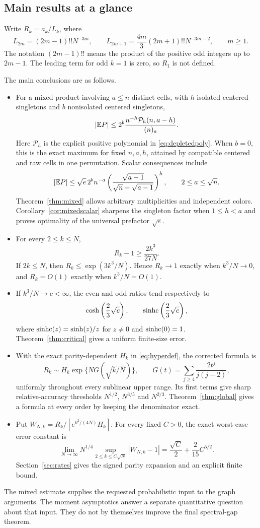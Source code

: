 \subsection{Main results at a glance}

Write $R_k=a_k/L_k$, where
\begin{equation}\label{eq:leading}
L_{2m}=(2m-1)!!N^{-3m},\qquad
L_{2m+1}=\frac{4m}{3}(2m+1)!!N^{-3m-2},\qquad m\ge1.
\end{equation}
The notation $(2m-1)!!$ means the product of the positive odd integers up to $2m-1$. The leading term for odd $k=1$ is zero, so $R_1$ is not defined.

The main conclusions are as follows.
\begin{itemize}
\item For a mixed product involving $a\le n$ distinct cells, with $h$ isolated centered singletons and $b$ nonisolated centered singletons,
\[
|\mathbb E P|\le2^b\frac{n^{-h}\mathcal P_h(n,a-h)}{(n)_a}.
\]
Here $\mathcal P_h$ is the explicit positive polynomial in \eqref{eq:depletedpoly}. When $b=0$, this is the exact maximum for fixed $n,a,h$, attained by compatible centered and raw cells in one permutation. Scalar consequences include
\[
|\mathbb E P|\le\sqrt e\,2^b n^{-a}
\left(\frac{\sqrt{a-1}}{\sqrt n-\sqrt{a-1}}\right)^h,
\qquad 2\le a\le\sqrt n.
\]
Theorem~\ref{thm:mixed} allows arbitrary multiplicities and independent colors. Corollary~\ref{cor:mixedscalar} sharpens the singleton factor when $1\le h<a$ and proves optimality of the universal prefactor $\sqrt e$.
\item For every $2\le k\le N$,
\[
R_k-1\ge\frac{2k^3}{27N}.
\]
If $2k\le N$, then $R_k\le\exp(3k^3/N)$. Hence $R_k\to1$ exactly when $k^3/N\to0$, and $R_k=O(1)$ exactly when $k^3/N=O(1)$.
\item If $k^3/N\to c<\infty$, the even and odd ratios tend respectively to
\[
\cosh\left(\frac23\sqrt c\right),\qquad
\operatorname{sinhc}\left(\frac23\sqrt c\right),
\]
where $\operatorname{sinhc}(z)=\sinh(z)/z$ for $z\ne0$ and $\operatorname{sinhc}(0)=1$. Theorem~\ref{thm:critical} gives a uniform finite-size error.
\item With the exact parity-dependent $H_k$ in \eqref{eq:hyperdef}, the corrected formula is
\[
R_k\sim H_k\exp\{NG(\sqrt{k/N})\},\qquad
G(t)=\sum_{j\ge4}\frac{2t^j}{j(j-2)},
\]
uniformly throughout every sublinear upper range. Its first terms give sharp relative-accuracy thresholds $N^{1/2}$, $N^{3/5}$ and $N^{2/3}$. Theorem~\ref{thm:global} gives a formula at every order by keeping the denominator exact.
\item Put $W_{N,k}=R_k/[e^{k^2/(4N)}H_k]$. For every fixed $C>0$, the exact worst-case error constant is
\[
\lim_{N\to\infty}N^{1/4}
\sup_{2\le k\le C\sqrt N}|W_{N,k}-1|
=\frac{\sqrt C}{2}+\frac{2}{15}C^{5/2}.
\]
Section~\ref{sec:rates} gives the signed parity expansion and an explicit finite bound.
\end{itemize}

The mixed estimate supplies the requested probabilistic input to the graph arguments. The moment asymptotics answer a separate quantitative question about that input. They do not by themselves improve the final spectral-gap theorem.
